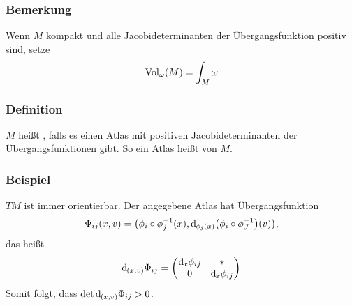 \subsubsection[Bemerkung: Volumen von kompakten Mannigfaltigkeiten]{Bemerkung}
\label{ssub:1100}
Wenn $M$ kompakt und alle Jacobideterminanten der Übergangsfunktion positiv sind, setze 
\[
\operatorname{Vol}_\omega (M) = \int_M \omega
\]

\subsubsection{Definition}
\label{ssub:1101}
$M$ heißt , falls es einen Atlas mit positiven Jacobideterminanten der Übergangsfunktionen gibt. So ein Atlas heißt  von $M$.

\subsubsection{Beispiel}
\label{ssub:1102}
$TM$ ist immer orientierbar. Der angegebene Atlas hat Übergangsfunktion 
\[
\Phi_{ij} (x,v) = \enbrace*{\phi_i \circ \phi_j^{-1} (x), \mathd _{\phi_j(x)}\enbrace*{\phi_i \circ \phi_J^{-1}}(v)},
\]
das heißt
\[
\mathrm{d}\mkern-1.0mu_{(x,v)} \Phi_{ij} = \begin{pmatrix}
\mathrm{d}\mkern-1.0mu_x \phi_{ij} & *\\
0 & \mathrm{d}\mkern-1.0mu_x \phi_{ij}
\end{pmatrix}
\]
Somit folgt, dass $\det \mathrm{d}\mkern-1.0mu_{(x,v)} \Phi_{ij} > 0$.

